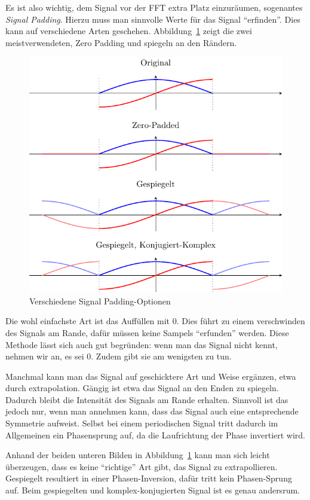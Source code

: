 Es ist also wichtig, dem Signal vor der FFT extra Platz einzuräumen, sogenantes \emph{Signal Padding}.
Hierzu muss man sinnvolle Werte für das Signal ``erfinden''.
Dies kann auf verschiedene Arten geschehen.
Abbildung~\ref{complex:padding} zeigt die zwei meistverwendeten, Zero Padding und spiegeln an den Rändern.
\begin{figure}
	\centering
	\includegraphics{papers/complex/images/signal_padding.pdf}
	\caption{Verschiedene Signal Padding-Optionen}
	\label{complex:padding}
\end{figure}

Die wohl einfachste Art ist das Auffüllen mit $0$.
Dies führt zu einem verschwinden des Signals am Rande, dafür müssen keine Sampels ``erfunden'' werden.
Diese Methode lässt sich auch gut begründen: wenn man das Signal nicht kennt, nehmen wir an, es sei $0$.
Zudem gibt sie am wenigsten zu tun.

Manchmal kann man das Signal auf geschicktere Art und Weise ergänzen, etwa durch extrapolation.
Gängig ist etwa das Signal an den Enden zu spiegeln.
Dadurch bleibt die Intensität des Signals am Rande erhalten.
Sinnvoll ist das jedoch nur, wenn man annehmen kann, dass das Signal auch eine entsprechende Symmetrie aufweist.
Selbst bei einem periodischen Signal tritt dadurch im Allgemeinen ein Phasensprung auf, da die Laufrichtung der Phase invertiert wird.

Anhand der beiden unteren Bilden in Abbildung~\ref{complex:padding} kann man sich leicht überzeugen, dass es keine ``richtige'' Art gibt, das Signal zu extrapollieren.
Gespiegelt resultiert in einer Phasen-Inversion, dafür tritt kein Phasen-Sprung auf.
Beim gespiegelten und komplex-konjugierten Signal ist es genau andersrum.

